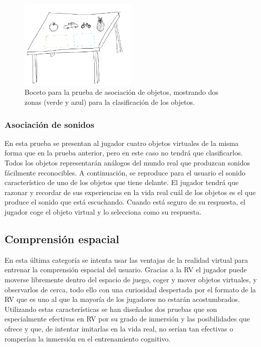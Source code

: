 \begin{figure}
  \centering
    \includegraphics[width=0.5\textwidth]{03.EstudioProblema/02.AnalisisInicial/00.Figuras/04.agrupacion_objetos.png}
    \caption{Boceto para la prueba de asociación de objetos, mostrando dos zonas (verde y azul) para la clasificación de los objetos.}
    \label{fig:AI_agrupacion}
\end{figure}

\subsubsection{Asociación de sonidos}

En esta prueba se presentan al jugador cuatro objetos virtuales de la misma forma que en la prueba anterior, pero en este caso no tendrá que clasificarlos. Todos los objetos representarán análogos del mundo real que produzcan sonidos fácilmente reconocibles. A continuación, se reproduce para el usuario el sonido característico de uno de los objetos que tiene delante. El jugador tendrá que razonar y recordar de sus experiencias en la vida real cuál de los objetos es el que produce el sonido que está escuchando. Cuando está seguro de su respuesta, el jugador coge el objeto virtual y lo selecciona como su respuesta.




\subsection{Comprensión espacial}

En esta última categoría se intenta usar las ventajas de la realidad virtual para entrenar la comprensión espacial del usuario. Gracias a la RV el jugador puede moverse libremente dentro del espacio de juego, coger y mover objetos virtuales, y observarlos de cerca, todo ello con una curiosidad despertada por el formato de la RV que es uno al que la mayoría de los jugadores no estarán acostumbrados. Utilizando estas características se han diseñados dos pruebas que son especialmente efectivas en RV por su grado de inmersión y las posibilidades que ofrece y que, de intentar imitarlas en la vida real, no serían tan efectivas o romperían la inmersión en el entrenamiento cognitivo.


